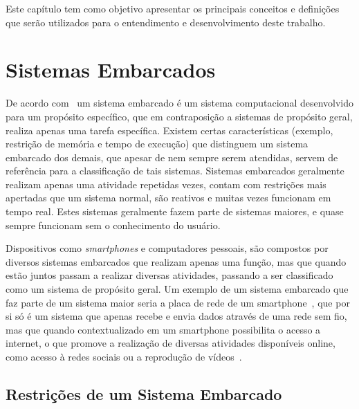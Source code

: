 \label{chapter:conceitos}
Este capítulo tem como objetivo apresentar os principais conceitos e definições que serão utilizados para o entendimento e desenvolvimento deste trabalho. 


\section{Sistemas Embarcados}%

De acordo com~ um sistema embarcado é um sistema computacional desenvolvido para um propósito específico, que em contraposição a sistemas de propósito geral, realiza apenas uma tarefa específica. Existem certas características (exemplo, restrição de memória e tempo de execução) que distinguem um sistema embarcado dos demais, que apesar de nem sempre serem atendidas, servem de referência para a classificação de tais sistemas. Sistemas embarcados geralmente realizam apenas uma atividade repetidas vezes, contam com restrições mais apertadas que um sistema normal, são reativos e muitas vezes funcionam em tempo real. Estes sistemas geralmente fazem parte de sistemas maiores, e quase sempre funcionam sem o conhecimento do usuário.

Dispositivos como \textit{smartphones} e computadores pessoais, são compostos por diversos sistemas embarcados que realizam apenas uma função, mas que quando estão juntos passam a realizar diversas atividades, passando a ser classificado como um sistema de propósito geral. Um exemplo de um sistema embarcado que faz parte de um sistema maior seria a placa de rede de um smartphone~\cite{qualcomm_2017}, que por si só é um sistema que apenas recebe e envia dados através de uma rede sem fio, mas que quando contextualizado em um smartphone possibilita o acesso a internet, o que promove a realização de diversas atividades disponíveis online, como acesso à redes sociais ou a reprodução de vídeos~\cite{VAHID:2001}.




\subsection{Restrições de um Sistema Embarcado} %

